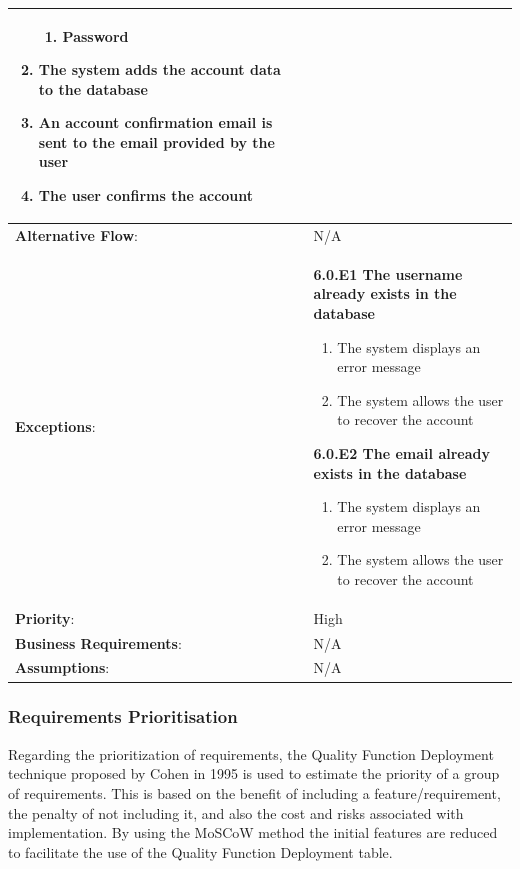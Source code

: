 \begin{table}[H]
\begin{adjustbox}{width=1.2\textwidth,center=\textwidth}
\begin{tabular}{|m{4cm}|m{12cm}|}
\begin{enumerate}
\begin{enumerate}
                    \item Password
                \end{enumerate}
                \item The system adds the account data to the database
                \item An account confirmation email is sent to the email provided by the user
                \item The user confirms the account
            \end{enumerate} \\
            \hline
            \textbf{Alternative Flow}: & N/A \\
            \hline
            \textbf{Exceptions}: & \textbf{6.0.E1  The username already exists in the database}
            \begin{enumerate}
                \item The system displays an error message
                \item The system allows the user to recover the account
            \end{enumerate}
            \textbf{6.0.E2 The email already exists in the database}
            \begin{enumerate}
                \item The system displays an error message
                \item The system allows the user to recover the account
            \end{enumerate} \\
            \hline
            \textbf{Priority}: & High \\
            \hline
            \textbf{Business Requirements}: & N/A \\
            \hline
            \textbf{Assumptions}: & N/A \\
            \hline
        \end{tabular}
    \end{adjustbox}
\end{table}

\vspace*{\fill}

\subsubsection{Requirements Prioritisation}

Regarding the prioritization of requirements, the Quality Function Deployment technique
proposed by Cohen in 1995 \cite{cohen1995quality} is used to estimate the priority of a group of requirements.
This is based on the benefit of including a feature/requirement, the penalty of not including
it, and also the cost and risks associated with implementation. By using the MoSCoW method \cite{clegg1994case} the
initial features are reduced to facilitate the use of the Quality Function Deployment table.

